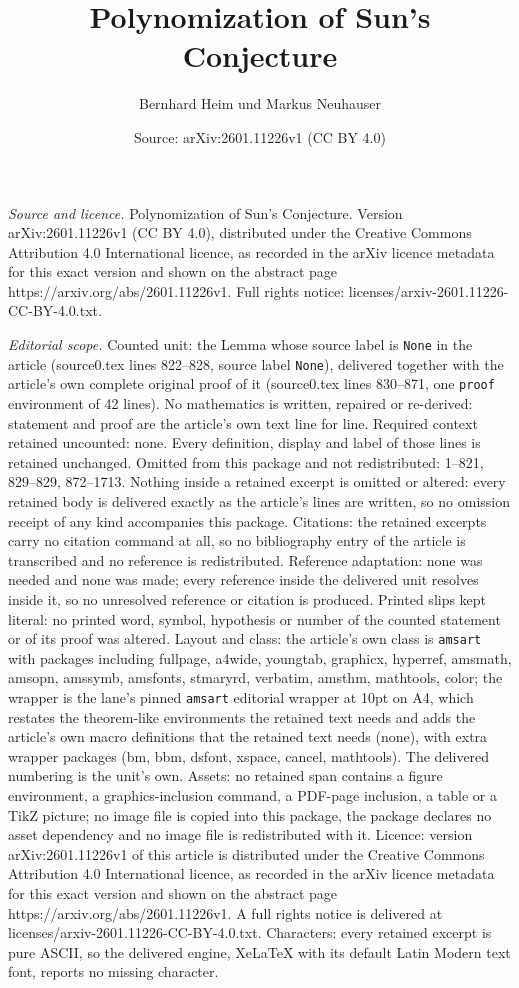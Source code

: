 \documentclass[10pt,a4paper]{amsart}
\title[Polynomization of Sun's Conjecture]{Polynomization of Sun's Conjecture}
\author{Bernhard Heim und Markus Neuhauser}
\date{Source: arXiv:2601.11226v1 (CC BY 4.0)}
\begin{document}
\maketitle

\noindent\emph{Source and licence.} Polynomization of Sun's Conjecture. Version arXiv:2601.11226v1 (CC BY 4.0), distributed under the Creative Commons Attribution 4.0 International licence, as recorded in the arXiv licence metadata for this exact version and shown on the abstract page https://arxiv.org/abs/2601.11226v1. Full rights notice: licenses/arxiv-2601.11226-CC-BY-4.0.txt.\par\smallskip

\noindent\textit{Editorial scope.} Counted unit: the Lemma whose source label is \texttt{None} in the article (source0.tex lines 822--828, source label \texttt{None}), delivered together with the article's own complete original proof of it (source0.tex lines 830--871, one \texttt{proof} environment of 42 lines). No mathematics is written, repaired or re-derived: statement and proof are the article's own text line for line. Required context retained uncounted: none. Every definition, display and label of those lines is retained unchanged. Omitted from this package and not redistributed: 1--821, 829--829, 872--1713. Nothing inside a retained excerpt is omitted or altered: every retained body is delivered exactly as the article's lines are written, so no omission receipt of any kind accompanies this package. Citations: the retained excerpts carry no citation command at all, so no bibliography entry of the article is transcribed and no reference is redistributed. Reference adaptation: none was needed and none was made; every reference inside the delivered unit resolves inside it, so no unresolved reference or citation is produced. Printed slips kept literal: no printed word, symbol, hypothesis or number of the counted statement or of its proof was altered. Layout and class: the article's own class is \texttt{amsart} with packages including fullpage, a4wide, youngtab, graphicx, hyperref, amsmath, amsopn, amssymb, amsfonts, stmaryrd, verbatim, amsthm, mathtools, color; the wrapper is the lane's pinned \texttt{amsart} editorial wrapper at 10pt on A4, which restates the theorem-like environments the retained text needs and adds the article's own macro definitions that the retained text needs (none), with extra wrapper packages (bm, bbm, dsfont, xspace, cancel, mathtools). The delivered numbering is the unit's own. Assets: no retained span contains a figure environment, a graphics-inclusion command, a PDF-page inclusion, a table or a TikZ picture; no image file is copied into this package, the package declares no asset dependency and no image file is redistributed with it. Licence: version arXiv:2601.11226v1 of this article is distributed under the Creative Commons Attribution 4.0 International licence, as recorded in the arXiv licence metadata for this exact version and shown on the abstract page https://arxiv.org/abs/2601.11226v1. A full rights notice is delivered at licenses/arxiv-2601.11226-CC-BY-4.0.txt. Characters: every retained excerpt is pure ASCII, so the delivered engine, XeLaTeX with its default Latin Modern text font, reports no missing character.
\end{document}
